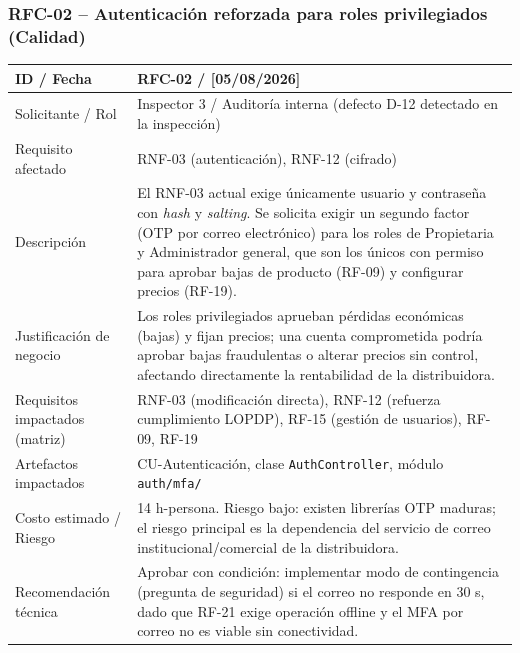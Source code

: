 \documentclass[11pt,a4paper]{article}
\begin{document}
\subsubsection*{RFC-02 -- Autenticación reforzada para roles privilegiados (Calidad)}
\begin{longtable}{|p{3.2cm}|p{9.8cm}|}
\hline
ID / Fecha & RFC-02 / [05/08/2026] \\
\hline
Solicitante / Rol & Inspector 3 / Auditoría interna (defecto D-12 detectado en la inspección) \\
\hline
Requisito afectado & RNF-03 (autenticación), RNF-12 (cifrado) \\
\hline
Descripción & El RNF-03 actual exige únicamente usuario y contraseña con \textit{hash} y \textit{salting}. Se solicita exigir un segundo factor (OTP por correo electrónico) para los roles de Propietaria y Administrador general, que son los únicos con permiso para aprobar bajas de producto (RF-09) y configurar precios (RF-19). \\
\hline
Justificación de negocio & Los roles privilegiados aprueban pérdidas económicas (bajas) y fijan precios; una cuenta comprometida podría aprobar bajas fraudulentas o alterar precios sin control, afectando directamente la rentabilidad de la distribuidora. \\
\hline
Requisitos impactados (matriz) & RNF-03 (modificación directa), RNF-12 (refuerza cumplimiento LOPDP), RF-15 (gestión de usuarios), RF-09, RF-19 \\
\hline
Artefactos impactados & CU-Autenticación, clase \texttt{AuthController}, módulo \texttt{auth/mfa/} \\
\hline
Costo estimado / Riesgo & 14 h-persona. Riesgo bajo: existen librerías OTP maduras; el riesgo principal es la dependencia del servicio de correo institucional/comercial de la distribuidora. \\
\hline
Recomendación técnica & Aprobar con condición: implementar modo de contingencia (pregunta de seguridad) si el correo no responde en 30 s, dado que RF-21 exige operación offline y el MFA por correo no es viable sin conectividad. \\
\hline
\end{longtable}
\end{document}
